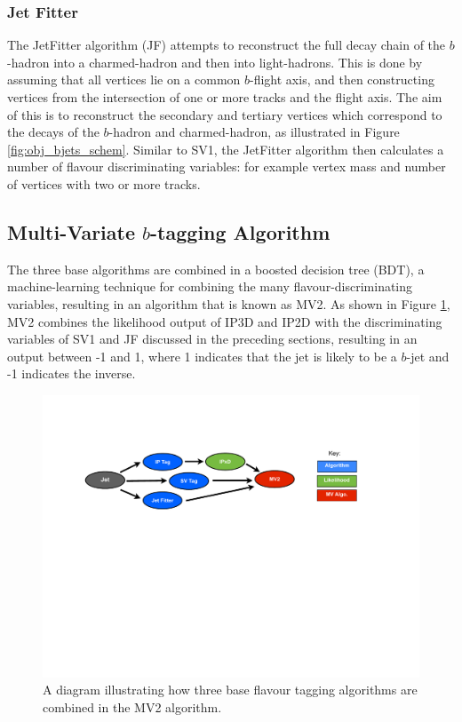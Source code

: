 \subsubsection{Jet Fitter}
\label{sec:obj-bjets_JF}

The JetFitter algorithm (JF) attempts to reconstruct the full decay chain of the $b$-hadron into a charmed-hadron and then into light-hadrons. 
This is done by assuming that all vertices lie on a common $b$-flight axis, and then constructing vertices from the intersection of
one or more tracks and the flight axis.
The aim of this is to reconstruct the secondary and tertiary vertices which correspond to the decays of the $b$-hadron and charmed-hadron,
as illustrated in Figure \ref{fig:obj_bjets_schem}.
Similar to SV1, the JetFitter algorithm then calculates a number of flavour discriminating variables:
for example vertex mass and number of vertices with two or more tracks.

\subsection{Multi-Variate $b$-tagging Algorithm}
\label{sec:obj-bjets_MV2}

The three base algorithms are combined in a boosted decision tree (BDT), a machine-learning technique for combining the many flavour-discriminating variables,
resulting in an algorithm that is known as MV2.
As shown in Figure \ref{fig:obj-MV2_schem}, MV2 combines the likelihood output of IP3D and IP2D
with the discriminating variables of SV1 and JF discussed in the preceding sections,
resulting in an output between -1 and 1, where 1 indicates that the jet is likely to be a $b$-jet and -1 indicates the inverse.

\begin{figure}[!htb]
  \begin{center}
    \includegraphics[width=1.0\textwidth]{figs/Objects/MV2_schem.pdf}
    \caption{A diagram illustrating how three base flavour tagging algorithms are combined in the MV2 algorithm.}
    \label{fig:obj-MV2_schem}
  \end{center}
  \vspace{-1cm}
\end{figure}



